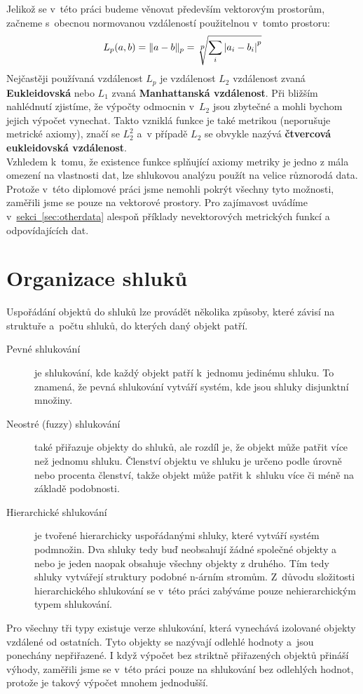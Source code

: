 Jelikož se v~této práci budeme věnovat především vektorovým prostorům, začneme s~obecnou normovanou vzdáleností použitelnou v~tomto prostoru:
$$L_p(a, b)=\|a-b\|_p=\sqrt[\leftroot{-1}\uproot{3}\scriptstyle p]{\sum_i |a_i - b_i|\strut^p} $$
Nejčastěji používaná vzdálenost $L_p$ je vzdálenost $L_2$ vzdálenost zvaná \textbf {Eukleidovská} nebo $L_1$ zvaná \textbf {Manhattanská vzdá\-le\-nost}.
Při bližším nahlédnutí zjistíme, že výpočty odmocnin v~$L_2$ jsou zbytečné a mohli bychom jejich výpočet vynechat. Takto vzniklá funkce je také metrikou (neporušuje metrické axiomy), značí se $L_2^2$  a~v případě $L_2$ se obvykle nazývá \textbf {čtvercová eukleidovská vzdálenost}.\\

Vzhledem k~tomu, že existence funkce splňující axiomy metriky je jedno z mála omezení na vlastnosti dat, lze shlukovou analýzu použít na velice různorodá data. Protože v~této diplomové práci jsme nemohli pokrýt všechny tyto možnosti, zaměřili jsme se pouze na vektorové prostory. Pro zajímavost uvádíme v~\hyperref[sec:otherdata]{sekci~\ref*{sec:otherdata}} alespoň příklady nevektorových metrických funkcí a odpovídajících dat.

\section{Organizace shluků} \label{sec:clusterorganization}
Uspořádání objektů do shluků lze provádět několika způsoby, které závisí na struktuře a~počtu shluků, do kterých daný objekt patří.
\begin{description}
\item[Pevné shlukování] je shlukování, kde každý objekt patří k~jednomu jedinému shluku. To znamená, že pevná shlukování vytváří systém, kde jsou shluky disjunktní množiny.
\item[Neostré (fuzzy) shlukování] také přiřazuje objekty do shluků, ale rozdíl je, že objekt může patřit více než jednomu shluku. Členství objektu ve shluku je určeno podle úrovně nebo procenta členství, takže objekt může patřit k~shluku více či méně na základě podobnosti.
\item[Hierarchické shlukování] je tvořené hierarchicky uspořádanými shluky, které vytváří systém podmnožin. Dva shluky tedy buď neobsahují žádné společné objekty a nebo je jeden naopak obsahuje všechny objekty z druhého. Tím tedy shluky vytvářejí struktury podobné n-árním stromům. Z~důvodu složitosti hierarchického shlukování se v~této práci zabýváme pouze nehierarchickým typem shlukování.
\end{description}
Pro všechny tři typy existuje verze shlukování, která vynechává izolované objekty vzdálené od ostatních. Tyto objekty se nazývají odlehlé hodnoty a~jsou ponechány nepřiřazené. I když výpočet bez striktně přiřazených objektů přináší výhody, zaměřili jsme se v~této práci pouze na shlukování bez odlehlých hodnot, protože je takový výpočet mnohem jednodušší.\\

